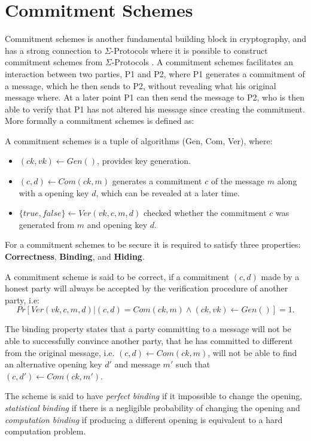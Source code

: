 \section{Commitment Schemes}
\label{sec:background:commitment}
Commitment schemes is another fundamental building block in cryptography, and
has a strong connection to $\Sigma$-Protocols where it is possible to construct
commitment schemes from $\Sigma$-Protocols \cite{cryptoeprint:2019:1185}. A commitment
schemes facilitates an interaction between two parties, P1 and P2, where P1
generates a commitment of a message, which he then sends to P2, without revealing
what his original message where. At a later point P1 can then send the message
to P2, who is then able to verify that P1 has not altered his message since
creating the commitment. More formally a commitment schemes is defined as:

\begin{definition}
A commitment schemes is a tuple of algorithms (Gen, Com, Ver), where:
\begin{itemize}
  \item $(ck, vk) \leftarrow Gen()$, provides key generation.
  \item $(c, d) \leftarrow Com(ck, m)$ generates a commitment $c$ of the message
    $m$ along with a opening key $d$, which can be revealed at a later time.
  \item $\{true, false\} \leftarrow Ver(vk, c, m, d)$ checked whether the
    commitment $c$ was generated from $m$ and opening key $d$.
\end{itemize}
\end{definition}

For a commitment schemes to be secure it is required to satisfy three
properties: \textbf{Correctness}, \textbf{Binding}, and \textbf{Hiding}.

\begin{definition}
A commitment scheme is said to be correct, if a commitment $(c, d)$ made by a
honest party will always be accepted by the verification procedure of another
party, i.e:
$$
Pr[Ver(vk, c, m, d) | (c, d) = Com(ck, m) \land (ck, vk) \leftarrow Gen()] = 1.
$$
\end{definition}

\begin{definition}
The binding property states that a party committing to a message will not be
able to successfully convince another party, that he has committed to different
from the original message, i.e. $(c, d) \leftarrow Com(ck, m)$, will not be able
to find an alternative opening key $d'$ and message $m'$ such that
$(c, d') \leftarrow Com(ck, m')$.

The scheme is said to have \textit{perfect binding} if it impossible to change the
opening, \textit{statistical binding} if there is a negligible probability of changing
the opening and \textit{computation binding} if producing a different opening is
equivalent to a hard computation problem.
\end{definition}

